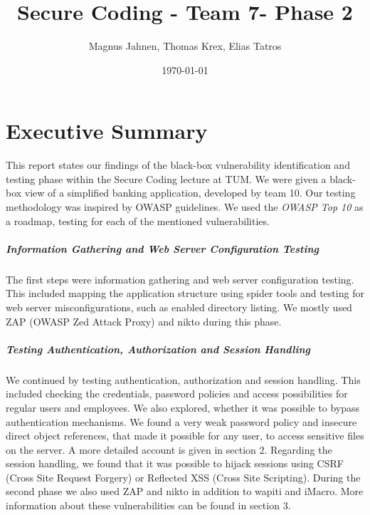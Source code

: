 \documentclass{report}
\title{Secure Coding - Team 7- Phase 2}
\author{Magnus Jahnen, Thomas Krex, Elias Tatros}
\date{\today}
\begin{document}
\maketitle

\part{Executive Summary}
This report states our findings of the black-box vulnerability identification and testing phase within the Secure Coding lecture at TUM. We were given a black-box view of a simplified banking application, developed by team 10. Our testing methodology was inspired by OWASP guidelines. We used the \emph{OWASP Top 10} as a roadmap, testing for each of the mentioned vulnerabilities. 

\subsubsection{Information Gathering and Web Server Configuration Testing}
The first steps were information gathering and web server configuration testing. This included mapping the application structure using spider tools and testing for web server misconfigurations, such as enabled directory listing. We mostly used ZAP (OWASP Zed Attack Proxy) and nikto during this phase. 

\subsubsection{Testing Authentication, Authorization and Session Handling}
We continued by testing authentication, authorization and session handling. This included checking the credentials, password policies and access possibilities for regular users and employees. We also explored, whether it was possible to bypass authentication mechanisms. We found a very weak password policy and insecure direct object references, that made it possible for any user, to access sensitive files on the server. A more detailed account is given in section 2. Regarding the session handling, we found that it was possible to hijack sessions using CSRF (Cross Site Request Forgery) or Reflected XSS (Cross Site Scripting). During the second phase we also used ZAP and nikto in addition to wapiti and iMacro. More information about these vulnerabilities can be found in section 3. 
\end{document}
